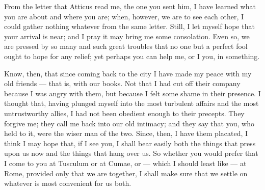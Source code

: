 

 From the letter that Atticus read me, the one you sent him, I have learned what you are about and where you are; when, however, we are to see each other, I could gather nothing whatever from the same letter. Still, I let myself hope that your arrival is near; and I pray it may bring me some consolation. Even so, we are pressed by so many and such great troubles that no one but a perfect fool ought to hope for any relief; yet perhaps you can help me, or I you, in something.

 Know, then, that since coming back to the city I have made my peace with my old friends --- that is, with our books. Not that I had cut off their company because I was angry with them, but because I felt some shame in their presence. I thought that, having plunged myself into the most turbulent affairs and the most untrustworthy allies, I had not been obedient enough to their precepts. They forgive me; they call me back into our old intimacy; and they say that you, who held to it, were the wiser man of the two. Since, then, I have them placated, I think I may hope that, if I see you, I shall bear easily both the things that press upon us now and the things that hang over us. So whether you would prefer that I come to you at Tusculum or at Cumae, or --- which I should least like --- at Rome, provided only that we are together, I shall make sure that we settle on whatever is most convenient for us both.
